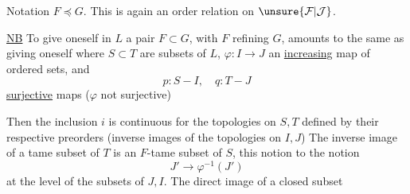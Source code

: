 Notation $F\preccurlyeq G$. This is again an order relation on $\unsure{\mathcal F|\mathcal J}$.

\uline{NB} To give oneself in $L$ a pair $F\subset G$, with $F$ refining $G$, amounts to the same as giving oneself
where $S\subset T$ are subsets of $L$, $\varphi:I\longrightarrow J$ an \uline{increasing} map of ordered sets, and 
\[p:S-I,\quad q:T-J\]
\uline{surjective} maps ($\varphi$ not  surjective)

Then the inclusion $i$ is continuous for the  topologies on $S,T$ defined by their respective preorders (inverse images of the topologies on $I,J$) The inverse image of a tame subset of $T$ is an $F$-tame subset of $S$, this notion  to the notion
\[J'\longrightarrow\varphi^{-1}(J')\]
at the level of the subsets of $J,I$. The direct image of a closed subset
